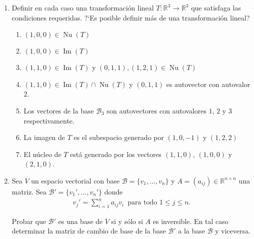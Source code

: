 \documentclass[12pt]{amsart}
\begin{document}
\begin{enumerate}
\item Definir en cada caso una transformaci\'on lineal $T:\mathbb{R}^3\longrightarrow\mathbb{R}^3$ que satisfaga las condiciones requeridas. ?`Es posible definir m\'as de una transformaci\'on lineal?
\begin{enumerate}
 \item $(1,0,0)\in \operatorname{Nu}(T)$ 
 \item $(1,0,0)\in \operatorname{Im}(T)$ 
 \item $(1,1,0) \in  \operatorname{Im}(T)$ y $(0,1,1),(1,2,1)\in\operatorname{Nu}(T)$
 \item $(1,1,0)\in \operatorname{Im}(T) \cap \operatorname{Nu}(T)$ y $(0,1,1)$ es autovector con autovalor $2$.
 \item Los vectores de la base $\mathcal{B}_3$ son autovectores con autovalores $1$, $2$ y $3$ respectivamente.
 \item La imagen de $T$ es el subespacio generado por $(1,0,-1)$ y $(1,2,2)$
 \item El n\'ucleo de $T$ est\' a generado por los vectores $(1,1,0)$, $(1,0,0)$ y $(2,1,0)$.
\end{enumerate}

\item Sea $V$ un espacio vectorial con base $\mathcal{B}=\{v_1, ..., v_n\}$ y $A=(a_{ij})\in\mathbb{R}^{n\times n}$ una matriz. Sea $\mathcal{B}'=\{v_1', ..., v_n'\}$ donde
\begin{align*}
v_j'=\sum_{i=1}^na_{ij}v_i\,\mbox{ para todo $1\leq j\leq n$}. 
\end{align*}

Probar que $\mathcal{B}'$ es una base de $V$ si y s\'olo si $A$ es inversible. En tal caso determinar la matriz de cambio de base de la base $\mathcal{B}'$ a la base $\mathcal{B}$ y viceversa.
\end{enumerate}















\end{document}
